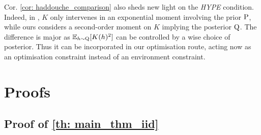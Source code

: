 \begin{noaddcontents}
Cor. \ref{cor: haddouche_comparison} also sheds new light on the \emph{HYPE} condition. Indeed, in \citet{haddouche2021pac}, $K$ only intervenes in an exponential moment involving the prior $\P$, while ours considers a second-order moment on $K$ implying the posterior $\Q$. The difference is major as $\mathbb{E}_{h\sim \Q}[K(h)^2] $ can be controlled by a wise choice of posterior. Thus it can be incorporated in our optimisation route, acting now as an optimisation constraint instead of an environment constraint.



\section{Proofs}
\label{sec: proofs}

\subsection{Proof of \cref{th: main_thm_iid}}


\end{noaddcontents}
